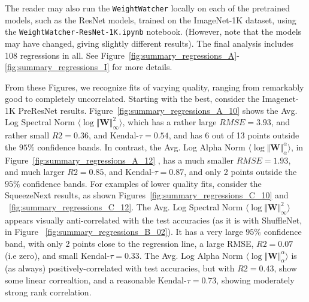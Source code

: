 The reader may also run the  \texttt{WeightWatcher} locally on each of the 
pretrained models,
such as the ResNet models, trained on the ImageNet-1K dataset, using the \texttt{WeightWatcher-ResNet-1K.ipynb} notebook.
(However, note that the models may have changed, giving slightly different results).
The final analysis includes 108 regressions in all.%
See Figure~\ref{fig:summary_regressions_A}-\ref{fig:summary_regressions_I} for more details.

From these Figures, we recognize fits of varying quality, ranging from remarkably good to completely uncorrelated.
Starting with the best, consider the Imagenet-1K PreResNet results.  Figure~\ref{fig:summary_regressions_A_10} shows 
the Avg. Log Spectral Norm $\langle\log\Vert\mathbf{W}\Vert^{2}_{\infty}\rangle$, 
which has a rather large $RMSE=3.93$, and rather small $R2=0.36$, and Kendal-$\tau=0.54$, and
has 6 out of 13 points outside the $95\%$ confidence bands.  In contrast, 
the Avg. Log Alpha Norm $\langle\log\Vert\mathbf{W}\Vert^{\alpha}_{\alpha}\rangle$, 
in  Figure~\ref{fig:summary_regressions_A_12} , 
has a much smaller $RMSE=1.93$, and much larger  $R2=0.85$, and Kendal-$\tau=0.87$, 
and only 2 points outside the $95\%$ confidence bands.
For examples of lower quality fits, consider the SqueezeNext results, as shown Figures~\ref{fig:summary_regressions_C_10} and 
~\ref{fig:summary_regressions_C_12}.  
The Avg. Log Spectral Norm $\langle\log\Vert\mathbf{W}\Vert^{2}_{\infty}\rangle$ appears
visually anti-correlated with the test accuracies
(as it is with ShuffleNet, in Figure ~\ref{fig:summary_regressions_B_02}).
It has a very large $95\%$ confidence band, with only 2 points close to the regression line, 
a large RMSE,  $R2=0.07$ (i.e zero), and small Kendal-$\tau=0.33$.  
The Avg. Log Alpha Norm $\langle\log\Vert\mathbf{W}\Vert^{\alpha}_{\alpha}\rangle$ is (as always) positively-correlated
with test accuracies, but with $R2=0.43$, show some linear correaltion, and a reasonable Kendal-$\tau=0.73$,
showing moderately strong rank correlation.














